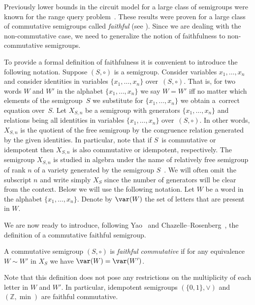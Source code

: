 Previously lower bounds in the circuit model for a large class of semigroups
were known for
%
%
the range query
problem~\cite{DBLP:conf/stoc/Yao82,DBLP:journals/ijcga/ChazelleR91}. These
results were proven for a large class of commutative semigroups called
\emph{faithful} (see ). Since we are dealing
with the non-commutative case, we need to generalize the notion of faithfulness
to non-commutative semigroups.

To provide a formal definition of faithfulness it is convenient to introduce the
following notation. Suppose $(S, \circ)$ is a
semigroup.  %
%
%
%
%
%
%
%
%
%
Consider variables $x_1,\ldots, x_n$ and consider identities in variables $\{x_1,\ldots, x_n\}$ over~$(S,\circ)$.
That is, for two words $W$ and $W'$ in
the alphabet $\{x_1,\ldots,x_n\}$ we say $W = W'$ iff no matter
which elements of the semigroup~$S$ we substitute for $\{x_1,\ldots, x_n\}$ we
obtain a~correct equation over~$S$.
Let $X_{S,n}$ be a semigroup with generators $\{x_1,\ldots, x_n\}$
and relations being all identities in variables $\{x_1,\ldots, x_n\}$ over~$(S,\circ)$.
%
In  %
other words, $X_{S,n}$ is the quotient of the free semigroup by the congruence relation generated by the given identities.
%
In particular, note that if $S$~is
%
%
commutative or idempotent then $X_{S,n}$ is also commutative or idempotent,
respectively.  %
The semigroup $X_{S,n}$ is studied in algebra under the name of relatively free
semigroup of rank $n$ of a variety generated by
the   %
semigroup
$S$~\cite{neumann2012varieties}. %
%
We will often omit the subscript $n$ and write
simply $X_S$ since the number of generators will be clear from the context.
Below we will use the following notation. Let $W$ be a word in the alphabet
$\{x_1,\ldots, x_n\}$. Denote by $\var(W)$ the set of letters that are present
in $W$.

We are now ready to introduce,
%
following Yao~\cite{DBLP:conf/stoc/Yao82} and
Chazelle--Rosenberg~\cite{DBLP:journals/ijcga/ChazelleR91},  %
the definition of a commutative faithful semigroup.

\begin{definition}  %
%
%
%
\label{def:faithfulcommutative}
A commutative semigroup $(S, \circ)$ is \emph{faithful commutative} if for any
equivalence $W\sim W'$ in $X_S$ we have $\var(W)=\var(W')$.
\end{definition}


Note that this definition does not pose any restrictions on the
%
%
multiplicity
of
each letter %
%
%
in $W$ and $W'$. In particular, %
%
%
idempotent semigroups
$(\{0,1\}, \vee)$ and $(\mathbb{Z},\min)$ are faithful commutative. %
%
%
%

